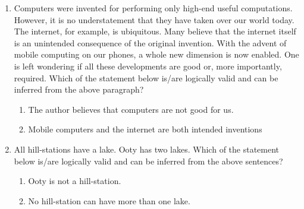 \documentclass[journal,12pt,onecolumn]{IEEEtran}
\theoremstyle{remark}
\begin{document}
\begin{enumerate}[start=1, label=Q.\arabic*]
    \item Computers were invented for performing only high-end useful computations. However, it is no understatement that they have taken over our world today. The internet, for example, is ubiquitous. Many believe that the internet itself is an unintended consequence of the original invention. With the advent of mobile computing on our phones, a whole new dimension is now enabled. One is left wondering if all these developments are good or, more importantly, required.
    Which of the statement below is/are logically valid and can be inferred from the above paragraph?
    \begin{enumerate}
        \item[\brak{i}] The author believes that computers are not good for us.
        \item[\brak{ii}] Mobile computers and the internet are both intended inventions
    \end{enumerate}
    \begin{enumerate}
    \end{enumerate}

    \hfill{}

    \item All hill-stations have a lake. Ooty has two lakes.
    Which of the statement below is/are logically valid and can be inferred from the above sentences?
    \begin{enumerate}
        \item[\brak{i}] Ooty is not a hill-station.
        \item[\brak{ii}] No hill-station can have more than one lake.
    \end{enumerate}
    \begin{enumerate}
    \end{enumerate}


\end{enumerate}
\end{document}
